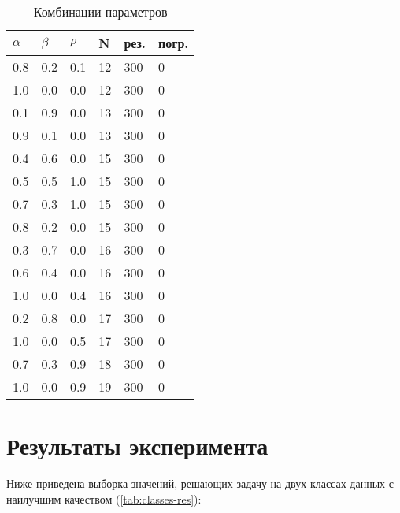\begin{table}[H]
	\centering
	\caption{Комбинации параметров}
	\renewcommand{\arraystretch}{1.15}
	\begin{tabular}{||p{}p{}p{}p{}p{}p{}||}
		\hline
		$\alpha$ & $\beta$ & $\rho$ & N & рез. & погр. \\ \hline\hline
		0.8 & 0.2 & 0.1 & 12 & 300 & 0 \\ 
		1.0 & 0.0 & 0.0 & 12 & 300 & 0 \\ 
		0.1 & 0.9 & 0.0 & 13 & 300 & 0 \\ 
		0.9 & 0.1 & 0.0 & 13 & 300 & 0 \\ 
		0.4 & 0.6 & 0.0 & 15 & 300 & 0 \\ 
		0.5 & 0.5 & 1.0 & 15 & 300 & 0 \\ 
		0.7 & 0.3 & 1.0 & 15 & 300 & 0 \\ 
		0.8 & 0.2 & 0.0 & 15 & 300 & 0 \\ 
		0.3 & 0.7 & 0.0 & 16 & 300 & 0 \\ 
		0.6 & 0.4 & 0.0 & 16 & 300 & 0 \\ 
		1.0 & 0.0 & 0.4 & 16 & 300 & 0 \\ 
		0.2 & 0.8 & 0.0 & 17 & 300 & 0 \\ 
		1.0 & 0.0 & 0.5 & 17 & 300 & 0 \\ 
		0.7 & 0.3 & 0.9 & 18 & 300 & 0 \\ 
		1.0 & 0.0 & 0.9 & 19 & 300 & 0 \\ 
		\hline
	\end{tabular}
	\label{tab:class2}
\end{table}

\section{Результаты эксперимента}

Ниже приведена выборка значений, решающих задачу на двух классах данных с наилучшим качеством (\ref{tab:classes-res}):

